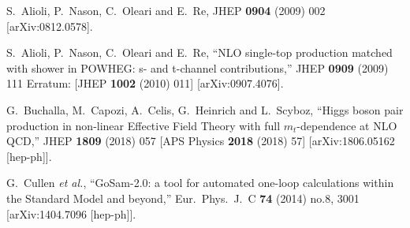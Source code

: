 \documentclass[paper]{JHEP3}
\begin{document}
\begin{thebibliography}{10}
  S.~Alioli, P.~Nason, C.~Oleari and E.~Re,
  JHEP {\bf 0904} (2009) 002
  [arXiv:0812.0578].

  S.~Alioli, P.~Nason, C.~Oleari and E.~Re,
  ``NLO single-top production matched with shower in POWHEG: s- and t-channel contributions,''
  JHEP {\bf 0909} (2009) 111
   Erratum: [JHEP {\bf 1002} (2010) 011]
  [arXiv:0907.4076].
  
  G.~Buchalla, M.~Capozi, A.~Celis, G.~Heinrich and L.~Scyboz,
  ``Higgs boson pair production in non-linear Effective Field Theory with full $m_t$-dependence at NLO QCD,''
  JHEP {\bf 1809} (2018) 057
   [APS Physics {\bf 2018} (2018) 57]
  [arXiv:1806.05162 [hep-ph]].
  
  G.~Cullen {\it et al.},
  ``GoSam-2.0: a tool for automated one-loop calculations within the Standard Model and beyond,''
  Eur.\ Phys.\ J.\ C {\bf 74} (2014) no.8,  3001
  [arXiv:1404.7096 [hep-ph]].

\end{thebibliography}
\end{document}
